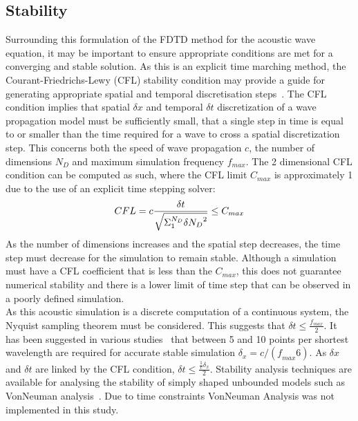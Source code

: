 \subsection{Stability}
Surrounding this formulation of the FDTD method for the acoustic wave equation, it may be important to ensure appropriate conditions are met for a converging and stable solution. As this is an explicit time marching method, the Courant-Friedrichs-Lewy (CFL) stability condition may provide a guide for generating appropriate spatial and temporal discretisation steps~\cite{Sakuma2014,Schneider2015,Angus2010,Bilbao2009,Hill2012}. The CFL condition implies that spatial $\delta x$ and temporal $\delta t$ discretization of a wave propagation model must be sufficiently small, that a single step in time is equal to or smaller than the time required for a wave to cross a spatial discretization step. This concerns both the speed of wave propagation $c$, the number of dimensions $N_D$ and maximum simulation frequency $f_{max}$. The 2 dimensional CFL condition can be computed as such, where the CFL limit $C_{max}$ is approximately 1 due to the use of an explicit time stepping solver:\\
\begin{equation}
CFL = c \frac{\delta t}{\sqrt{\Sigma_{1}^{N_D} \delta {N_{D}}^2}} \leq C_{max}\\
\end{equation}
As the number of dimensions increases and the spatial step decreases, the time step must decrease for the simulation to remain stable. Although a simulation must have a CFL coefficient that is less than the $C_{max}$, this does not guarantee numerical stability and there is a lower limit of time step that can be observed in a poorly defined simulation.\\
As this acoustic simulation is a discrete computation of a continuous system, the Nyquist sampling theorem must be considered. This suggests that $\delta t \leq \frac{f_{max}}{2}$. It has been suggested in various studies~\cite{Hill2012,VanMourik2014} that between 5 and 10 points per shortest wavelength are required for accurate stable simulation $\delta_x = c / (\textit{f}_{max} 6)$. As $\delta x$ and $\delta t$ are linked by the CFL condition, $\delta t \leq \frac{\frac{1}{c} \delta_x}{2}$. Stability analysis techniques are available for analysing the stability of simply shaped unbounded models such as VonNeuman analysis~\cite{Bilbao2009,Hamilton2013a}. Due to time constraints VonNeuman Analysis was not implemented in this study.

